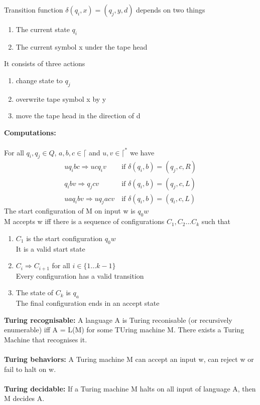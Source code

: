 \documentclass[a4paper,10pt]{article}
\begin{document}
Transition function $\delta(q_{i}, x) = (q_{j}, y, d)$ depends on two things 
\begin{enumerate}
\item The current state $q_{i}$
\item The current symbol x under the tape head 
\end{enumerate}
It consists of three actions 
\begin{enumerate}
\item change state to $q_{j}$
\item overwrite tape symbol x by y 
\item move the tape head in the direction of d
\end{enumerate}
\textcolor{JungleGreen}{\textbf{Computations:}} \\\\
For all $q_{i}, q_{j} \in Q$, $a,b,c \in \lceil$ and $u,v \in \lceil^{*}$ we have\\ 
\begin{align*}
uq_{i}bc \Rightarrow ucq_{i}v \ &\textrm{if } \delta(q_{i}, b) = (q_{j}, c, R) \\
q_{i}bv \Rightarrow q_{j}cv \ &\textrm{if } \delta(q_{i}, b) = (q_{j}, c, L) \\
uaq_{i}bv \Rightarrow uq_{j}acv \ &\textrm{if } \delta(q_{i}, b) = (q_{i}, c, L)
\end{align*}
The start configuration of M on input w is $q_{0}w$ \\
M accepts w iff there is a sequence of configurations $C_{1}, C_{2}... C_{k}$ such that 
\begin{enumerate}
\item $C_{1}$ is the start configuration $q_{0}w$ \\
It is a valid start state
\item $C_{i} \Rightarrow C_{i+1}$ for all $i \in \{1...k-1\}$\\
Every configuration has a valid transition
\item The state of $C_{k}$ is $q_{a}$ \\
The final configuration ends in an accept state
\end{enumerate}
\textcolor{JungleGreen}{\textbf{Turing recognisable:}} A language A is Turing reconisable (or recursively enumerable) iff A = L(M) for some TUring machine M. There exists a Turing Machine that recognises it.\\\\
\textcolor{JungleGreen}{\textbf{Turing behaviors:}} A Turing machine M can accept an input w, can reject w or fail to halt on w. \\\\
\textcolor{JungleGreen}{\textbf{Turing decidable:}} If a Turing machine M halts on all input of language A, then M decides A. \\\\
\newpage 
\end{document}

